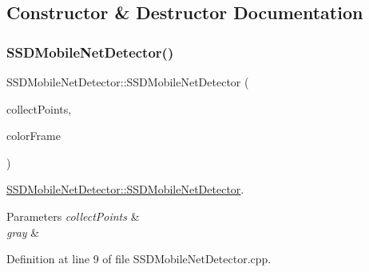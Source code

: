 \subsection{Constructor \& Destructor Documentation}
\mbox{\label{class_s_s_d_mobile_net_detector_a29de895fa6e8a3960837660460e23d41}} 
\subsubsection{\texorpdfstring{S\+S\+D\+Mobile\+Net\+Detector()}{SSDMobileNetDetector()}}
{\footnotesize\ttfamily S\+S\+D\+Mobile\+Net\+Detector\+::\+S\+S\+D\+Mobile\+Net\+Detector (\begin{DoxyParamCaption}\item[{bool}]{collect\+Points,  }\item[{cv\+::\+U\+Mat \&}]{color\+Frame }\end{DoxyParamCaption})}



\mbox{\hyperlink{class_s_s_d_mobile_net_detector_a29de895fa6e8a3960837660460e23d41}{S\+S\+D\+Mobile\+Net\+Detector\+::\+S\+S\+D\+Mobile\+Net\+Detector}}. 


\begin{DoxyParams}{Parameters}
{\em collect\+Points} & \\
\hline
{\em gray} & \\
\hline
\end{DoxyParams}


Definition at line 9 of file S\+S\+D\+Mobile\+Net\+Detector.\+cpp.


